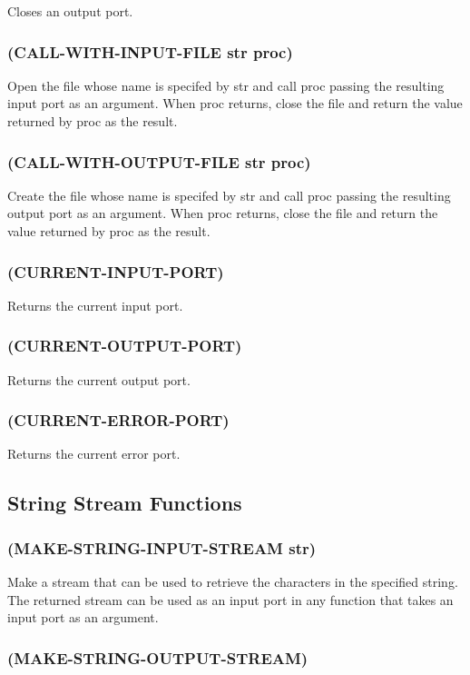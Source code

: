 \documentclass[11pt]{article}
\begin{document}
Closes an output port.
\subsubsection{(CALL-WITH-INPUT-FILE str proc)}
\label{sec-4-37-12}

Open the file whose name is specifed by str and call proc passing the
resulting input port as an argument.  When proc returns, close the
file and return the value returned by proc as the result.
\subsubsection{(CALL-WITH-OUTPUT-FILE str proc)}
\label{sec-4-37-13}

Create the file whose name is specifed by str and call proc passing
the resulting output port as an argument.  When proc returns, close
the file and return the value returned by proc as the result.
\subsubsection{(CURRENT-INPUT-PORT)}
\label{sec-4-37-14}

Returns the current input port.
\subsubsection{(CURRENT-OUTPUT-PORT)}
\label{sec-4-37-15}

Returns the current output port.
\subsubsection{(CURRENT-ERROR-PORT)}
\label{sec-4-37-16}

Returns the current error port.
\subsection{String Stream Functions}
\label{sec-4-38}

\subsubsection{(MAKE-STRING-INPUT-STREAM str)}
\label{sec-4-38-1}

Make a stream that can be used to retrieve the characters in the
specified string.  The returned stream can be used as an input port
in any function that takes an input port as an argument.
\subsubsection{(MAKE-STRING-OUTPUT-STREAM)}
\label{sec-4-38-2}
\end{document}
